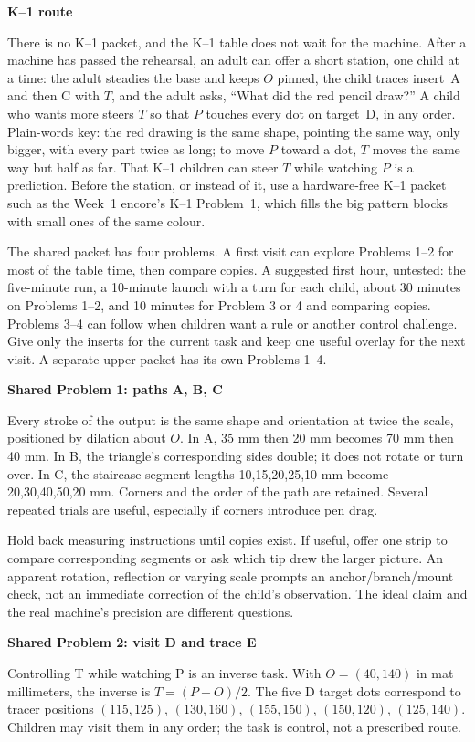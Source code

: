 \documentclass[11pt,letterpaper]{article}
\newcommand{\heading}[1]{\par\vspace{4pt}{\large\bfseries #1}\par}
\newcommand{\sub}[1]{\par\textbf{#1}\par}
\begin{document}
\sub{K--1 route}
There is no K--1 packet, and the K--1 table does not wait for the machine. After a machine has passed the rehearsal, an adult can offer a short station, one child at a time: the adult steadies the base and keeps $O$ pinned, the child traces insert~A and then C with $T$, and the adult asks, ``What did the red pencil draw?'' A child who wants more steers $T$ so that $P$ touches every dot on target~D, in any order. Plain-words key: the red drawing is the same shape, pointing the same way, only bigger, with every part twice as long; to move $P$ toward a dot, $T$ moves the same way but half as far. That K--1 children can steer $T$ while watching $P$ is a prediction. Before the station, or instead of it, use a hardware-free K--1 packet such as the Week~1 encore's K--1 Problem~1, which fills the big pattern blocks with small ones of the same colour.
\newpage
\heading{Shared packet: copying and control}
The shared packet has four problems. A first visit can explore Problems 1--2 for most of the table time, then compare copies. A suggested first hour, untested: the five-minute run, a 10-minute launch with a turn for each child, about 30 minutes on Problems 1--2, and 10 minutes for Problem 3 or 4 and comparing copies. Problems 3--4 can follow when children want a rule or another control challenge. Give only the inserts for the current task and keep one useful overlay for the next visit. A separate upper packet has its own Problems 1--4.

\sub{Shared Problem 1: paths A, B, C}
Every stroke of the output is the same shape and orientation at twice the scale, positioned by dilation about $O$. In A, 35 mm then 20 mm becomes 70 mm then 40 mm. In B, the triangle's corresponding sides double; it does not rotate or turn over. In C, the staircase segment lengths 10,15,20,25,10 mm become 20,30,40,50,20 mm. Corners and the order of the path are retained. Several repeated trials are useful, especially if corners introduce pen drag.

Hold back measuring instructions until copies exist. If useful, offer one strip to compare corresponding segments or ask which tip drew the larger picture. An apparent rotation, reflection or varying scale prompts an anchor/branch/mount check, not an immediate correction of the child's observation. The ideal claim and the real machine's precision are different questions.

\sub{Shared Problem 2: visit D and trace E}
Controlling T while watching P is an inverse task. With $O=(40,140)$ in mat millimeters, the inverse is $T=(P+O)/2$. The five D target dots correspond to tracer positions $(115,125)$, $(130,160)$, $(155,150)$, $(150,120)$, $(125,140)$. Children may visit them in any order; the task is control, not a prescribed route.
\end{document}
